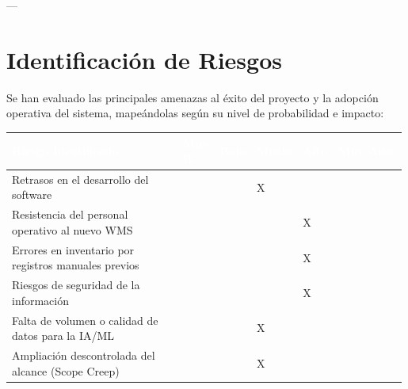 \documentclass[11pt]{article}
\newcounter{none} %
\begin{document}
---

\section{Identificación de Riesgos}

Se han evaluado las principales amenazas al éxito del proyecto y la adopción operativa del sistema, mapeándolas según su nivel de probabilidad e impacto:

\vspace{0.3cm}
\setlength{\tabcolsep}{5pt}
\renewcommand{\arraystretch}{1.5}
{\def\LTcaptype{none}
\begin{longtable}[]{@{}
  >{\raggedright\arraybackslash}p{0.45\linewidth}
  >{\centering\arraybackslash}p{0.09\linewidth}
  >{\centering\arraybackslash}p{0.09\linewidth}
  >{\centering\arraybackslash}p{0.09\linewidth}
  >{\centering\arraybackslash}p{0.09\linewidth}
  >{\centering\arraybackslash}p{0.18\linewidth}@{}}
\rowcolor{DeepNavy}
\textcolor{white}{\textbf{Riesgo Identificado}} & \textcolor{white}{\textbf{Muy B.}} & \textcolor{white}{\textbf{Bajo}} & \textcolor{white}{\textbf{Medio}} & \textcolor{white}{\textbf{Alto}} & \textcolor{white}{\textbf{Muy Alto}} \\ \hline
\endhead
\rowcolor{LightGray}
Retrasos en el desarrollo del software & & & X & & \\ \hline
Resistencia del personal operativo al nuevo WMS & & & & X & \\ \hline
\rowcolor{LightGray}
Errores en inventario por registros manuales previos & & & & X & \\ \hline
Riesgos de seguridad de la información & & & & X & \\ \hline
\rowcolor{LightGray}
Falta de volumen o calidad de datos para la IA/ML & & & X & & \\ \hline
Ampliación descontrolada del alcance (Scope Creep) & & & X & & \\ \hline
\end{longtable}
}
\end{document}
